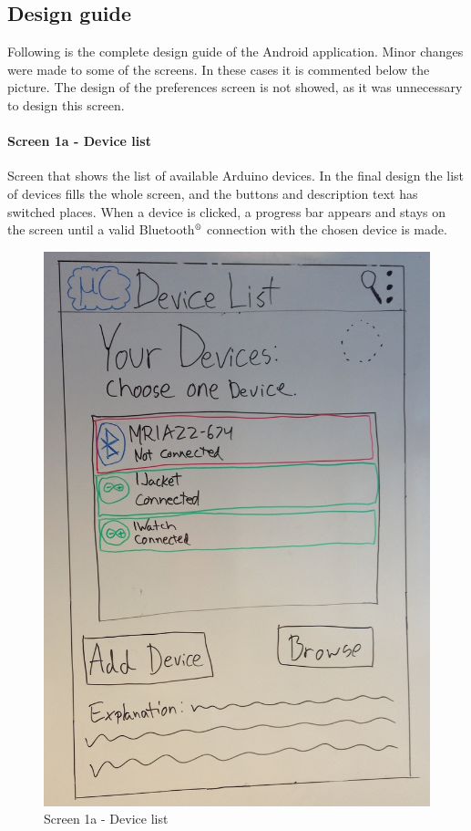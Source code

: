\subsection{Design guide}
Following is the complete design guide of the Android application. Minor changes were made to some of the screens. In these cases it is commented below the picture. The design of the preferences screen is not showed, as it was unnecessary to design this screen.

\paragraph{Screen 1a - Device list}
Screen that shows the list of available Arduino devices. In the final design the list of devices fills the whole screen, and the buttons and description text has switched places. When a device is clicked, a progress bar appears and stays on the screen until a valid Bluetooth$\textsuperscript{\textregistered}$ connection with the chosen device is made.

\begin{figure}[H]
\centering
\includegraphics[scale=0.2]{images/Design_guide/Screen1a.png}
\caption{Screen 1a - Device list}
\end{figure}


